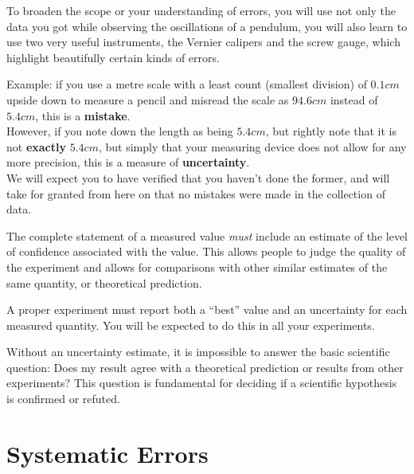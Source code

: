 To broaden the scope or your understanding of errors, you will use not only the data you got while observing the oscillations of a pendulum, you will also learn to use two very useful instruments, the Vernier calipers and the screw gauge, which highlight beautifully certain kinds of errors.

\begin{tip}
Example: if you use a metre scale with a least count (smallest division) of $0.1 cm$ upside down to measure a pencil and misread the scale as $94.6 cm$ instead of $5.4 cm$, this is a \textbf{mistake}.\\

However, if you note down the length as being $5.4 cm$, but rightly note that it is not \textbf{exactly} $5.4 cm$, but simply that your measuring device does not allow for any more precision, this is a measure of \textbf{uncertainty}. \\

We will expect you to have verified that you haven't done the former, and will take for granted from here on that no mistakes were made in the collection of data.
\end{tip}

The complete statement of a measured value \textit{must} include an estimate of the level of confidence associated with the value. This allows people to judge the quality of the experiment and allows for comparisons with other similar estimates of the same quantity, or theoretical prediction.  

\begin{imp}
A proper experiment must report both a ``best'' value and an uncertainty for each measured quantity. You will be expected to do this in all your experiments. 
\end{imp}

Without an uncertainty estimate, it is impossible to answer the basic scientific question: Does my result agree with a theoretical prediction or results from other experiments? This question is fundamental for deciding if a scientific hypothesis is confirmed or refuted.

\section{Systematic Errors} 

